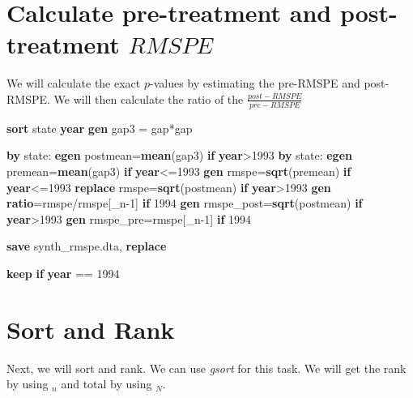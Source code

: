 \documentclass[
]{book}
\newenvironment{Shaded}{\begin{snugshade}}{\end{snugshade}}
\newcommand{\DataTypeTok}[1]{\textcolor[rgb]{0.13,0.29,0.53}{#1}}
\newcommand{\FunctionTok}[1]{\textcolor[rgb]{0.13,0.29,0.53}{\textbf{#1}}}
\newcommand{\KeywordTok}[1]{\textcolor[rgb]{0.13,0.29,0.53}{\textbf{#1}}}
\newcommand{\NormalTok}[1]{#1}
\begin{document}
\section{\texorpdfstring{Calculate pre-treatment and post-treatment \(RMSPE\)}{Calculate pre-treatment and post-treatment RMSPE}}\label{calculate-pre-treatment-and-post-treatment-rmspe}

We will calculate the exact \(p\)-values by estimating the pre-RMSPE and post-RMSPE. We will then calculate the ratio of the \(\frac{post-RMSPE}{pre-RMSPE}\)

\begin{Shaded}
\begin{Highlighting}[]
\KeywordTok{sort}\NormalTok{ state }\FunctionTok{year}
\KeywordTok{gen}\NormalTok{ gap3 = gap*gap}

\KeywordTok{by}\NormalTok{ state: }\KeywordTok{egen}\NormalTok{ postmean=}\KeywordTok{mean}\NormalTok{(gap3) }\KeywordTok{if} \FunctionTok{year}\NormalTok{\textgreater{}1993}
\KeywordTok{by}\NormalTok{ state: }\KeywordTok{egen}\NormalTok{ premean=}\KeywordTok{mean}\NormalTok{(gap3) }\KeywordTok{if} \FunctionTok{year}\NormalTok{\textless{}=1993}
\KeywordTok{gen}\NormalTok{ rmspe=}\FunctionTok{sqrt}\NormalTok{(premean) }\KeywordTok{if} \FunctionTok{year}\NormalTok{\textless{}=1993}
\KeywordTok{replace}\NormalTok{ rmspe=}\FunctionTok{sqrt}\NormalTok{(postmean) }\KeywordTok{if} \FunctionTok{year}\NormalTok{\textgreater{}1993}
\KeywordTok{gen} \KeywordTok{ratio}\NormalTok{=rmspe/rmspe[}\DataTypeTok{\_n}\NormalTok{{-}1] }\KeywordTok{if}\NormalTok{ 1994}
\KeywordTok{gen}\NormalTok{ rmspe\_post=}\FunctionTok{sqrt}\NormalTok{(postmean) }\KeywordTok{if} \FunctionTok{year}\NormalTok{\textgreater{}1993}
\KeywordTok{gen}\NormalTok{ rmspe\_pre=rmspe[}\DataTypeTok{\_n}\NormalTok{{-}1] }\KeywordTok{if}\NormalTok{ 1994}

\KeywordTok{save}\NormalTok{ synth\_rmspe.dta, }\KeywordTok{replace}

\KeywordTok{keep} \KeywordTok{if} \FunctionTok{year}\NormalTok{ == 1994}
\end{Highlighting}
\end{Shaded}

\section{Sort and Rank}\label{sort-and-rank}

Next, we will sort and rank. We can use \emph{gsort} for this task. We will get the rank by using \(_n\) and total by using \(_N\).
\end{document}
